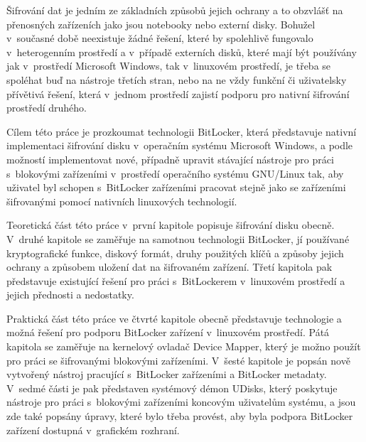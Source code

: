 

Šifrování dat je jedním ze základních způsobů jejich ochrany a to obzvlášť na přenosných zařízeních jako jsou notebooky nebo externí disky. Bohužel v~současné době neexistuje žádné řešení, které by spolehlivě fungovalo v~heterogenním prostředí a v~případě externích disků, které mají být používány jak v~prostředí Microsoft Windows, tak v~li\-nu\-xo\-vém prostředí, je třeba se spoléhat buď na nástroje třetích stran, nebo na ne vždy funkční či uživatelsky přívětivá řešení, která v~jednom prostředí zajistí podporu pro nativní šifrování prostředí druhého.

Cílem této práce je prozkoumat technologii BitLocker, která představuje nativní implementaci šifrování disku v~operačním systému Microsoft Windows, a podle možností implementovat nové, případně upravit stávající nástroje pro práci s~blokovými zařízeními v~prostředí operačního systému GNU/Linux tak, aby uživatel byl schopen s~BitLocker zařízeními pracovat stejně jako se zařízeními šifrovanými pomocí nativních linuxových technologií.

Teoretická část této práce v~první kapitole popisuje šifrování disku obecně. V~druhé kapitole se zaměřuje na samotnou technologii BitLocker, jí používané kryptografické funkce, diskový formát, druhy použitých klíčů a způsoby jejich ochrany a způsobem uložení dat na šifrovaném zařízení. Třetí kapitola pak představuje existující řešení pro práci s~BitLockerem v~linuxovém prostředí a jejich přednosti a nedostatky.

Praktická část této práce ve čtvrté kapitole obecně představuje technologie a možná řešení pro podporu BitLocker zařízení v~linuxovém prostředí. Pátá kapitola se zaměřuje na kernelový ovladač Device Mapper, který je možno použít pro práci se šifrovanými blokovými zařízeními. V~šesté kapitole je popsán nově vytvořený nástroj pracující s~BitLocker zařízeními a BitLocker metadaty. V~sedmé části je pak představen systémový démon UDisks, který poskytuje nástroje pro práci s~blokovými zařízeními koncovým uživatelům systému, a jsou zde také popsány úpravy, které bylo třeba provést, aby byla podpora BitLocker zařízení dostupná v~grafickém rozhraní.


